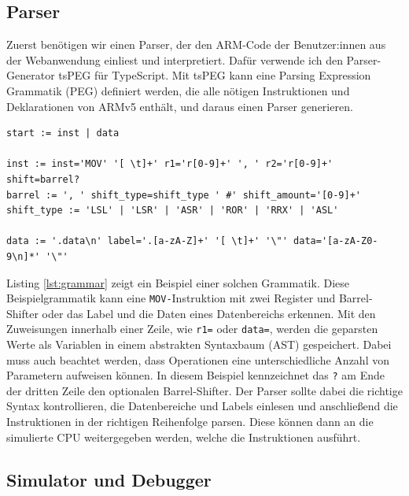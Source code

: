 \documentclass[a4paper, 11pt, onecolumn]{article}
\begin{document}
\subsection{Parser}

Zuerst benötigen wir einen Parser, der den ARM-Code der Benutzer:innen aus der Webanwendung einliest und interpretiert. Dafür verwende ich den Parser-Generator tsPEG \cite{tspeg} für TypeScript. Mit tsPEG kann eine Parsing Expression Grammatik (PEG) \cite{peg} definiert werden, die alle nötigen Instruktionen und Deklarationen von ARMv5 enthält, und daraus einen Parser generieren.

\begin{lstlisting}[caption={Beispielgrammatik mit tsPEG für die \texttt{MOV-}Instruktion mit 2 Registern und Barrel-Shifter oder Daten eines Speicherbereichs mit Label.},label={lst:grammar}]
start := inst | data

inst := inst='MOV' '[ \t]+' r1='r[0-9]+' ', ' r2='r[0-9]+' shift=barrel?
barrel := ', ' shift_type=shift_type ' #' shift_amount='[0-9]+'
shift_type := 'LSL' | 'LSR' | 'ASR' | 'ROR' | 'RRX' | 'ASL'

data := '.data\n' label='.[a-zA-Z]+' '[ \t]+' '\"' data='[a-zA-Z0-9\n]*' '\"'
\end{lstlisting}

Listing \ref{lst:grammar} zeigt ein Beispiel einer solchen Grammatik. Diese Beispielgrammatik kann eine \texttt{MOV-}Instruktion mit zwei Register und Barrel-Shifter oder das Label und die Daten eines Datenbereichs erkennen. Mit den Zuweisungen innerhalb einer Zeile, wie \glqq\texttt{r1=}\grqq{} oder \glqq\texttt{data=}\grqq, werden die geparsten Werte als Variablen in einem abstrakten Syntaxbaum (AST) gespeichert. Dabei muss auch beachtet werden, dass Operationen eine unterschiedliche Anzahl von Parametern aufweisen können. In diesem Beispiel kennzeichnet das \glqq\texttt{?}\grqq{} am Ende der dritten Zeile den optionalen Barrel-Shifter. Der Parser sollte dabei die richtige Syntax kontrollieren, die Datenbereiche und Labels einlesen und anschließend die Instruktionen in der richtigen Reihenfolge parsen. Diese können dann an die simulierte CPU weitergegeben werden, welche die Instruktionen ausführt.

\subsection{Simulator und Debugger}\label{sec:debug}
\end{document}
